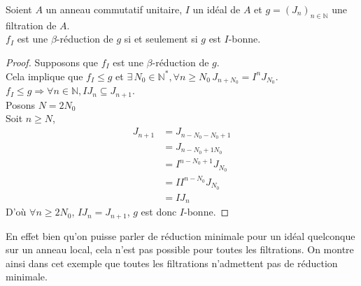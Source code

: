 \begin{maproposition}
	Soient $A$ un anneau commutatif unitaire, $I$ un idéal de $A$ et $g = (J_n)_{n \in \mathbb{N}}$ une filtration de $A$.\\
	$f_I$ est une $\beta$-réduction de $g$ si et seulement si $g$ est $I$-bonne.
\end{maproposition}
\begin{proof}
	Supposons que $f_I$ est une $\beta$-réduction de $g$.\\
	Cela implique que $f_I \leq g$ et $\exists \, N_0 \in \mathbb{N^*} , \forall n \geq N_0 \, J_{n+N_0} = I^n J_{N_0}$.\\
	$f_I \leq g \Rightarrow \forall n \in \mathbb{N} , IJ_n \subseteq J_{n+1}$.\\
	Posons $N = 2N_0$\\
	Soit $n \geq N$, 
	\begin{align*}
		J_{n+1} &= J_{n-N_0-N_0+1}\\
		&= J_{n-N_0+1N_0}\\
		&= I^{n-N_0+1} J_{N_0}\\
		&= II^{n-N_0} J_{N_0}\\
		&= IJ_n
	\end{align*}
	D'où $\forall n \geq 2N_0$, $IJ_n = J_{n+1}$, $g$ est donc $I$-bonne. 
\end{proof}
\begin{maremarque}
	En effet bien qu'on puisse parler de réduction minimale pour un idéal quelconque sur un anneau local, cela n'est pas possible pour toutes les filtrations. On montre ainsi dans cet exemple que toutes les filtrations n'admettent pas de réduction minimale.\\	
\end{maremarque}
